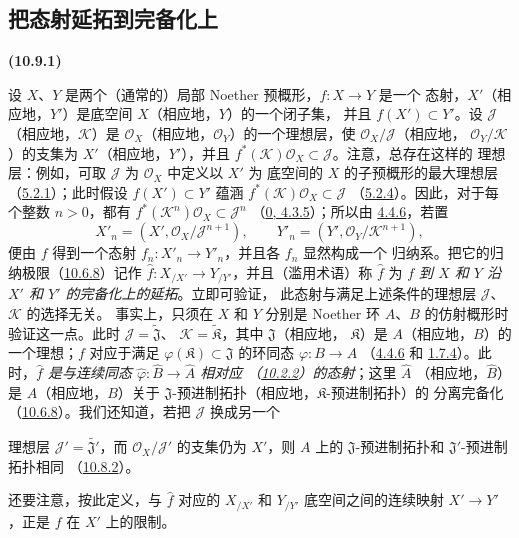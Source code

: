 \documentclass[UTF8,fontset=none,11pt,oneside,openany]{ctexbook}
\newenvironment{env}[1][]{%
  \par\medskip\noindent\textbf{(#1)}\ %
}{\par}
\newcommand{\oldpage}[2][]{%
  \hypertarget{ega-source-page-#1-#2}{}%
  \marginnote{\scriptsize\textbf{#1}~|~#2}\ignorespaces}
\let\EGAOriginalLabel\label
\renewcommand{\label}[1]{\phantomsection\EGAOriginalLabel{#1}}
\begin{document}
\subsection{把态射延拓到完备化上}
\label{subsection:I.10.9-fr}

\begin{env}[10.9.1]
\label{I.10.9.1-fr}
设 $X$、$Y$ 是两个（通常的）局部 Noether 预概形，$f:X\to Y$ 是一个
态射，$X'$（相应地，$Y'$）是底空间 $X$（相应地，$Y$）的一个闭子集，
并且 $f(X')\subset Y'$。设 $\mathscr{J}$（相应地，$\mathscr{K}$）是
$\mathscr{O}_X$（相应地，$\mathscr{O}_Y$）的一个理想层，使
$\mathscr{O}_X/\mathscr{J}$（相应地，
$\mathscr{O}_Y/\mathscr{K}$）的支集为 $X'$（相应地，$Y'$），并且
$f^*(\mathscr{K})\mathscr{O}_X\subset\mathscr{J}$。注意，总存在这样的
理想层：例如，可取 $\mathscr{J}$ 为 $\mathscr{O}_X$ 中定义以 $X'$ 为
底空间的 $X$ 的子预概形的最大理想层
（\hyperref[I.5.2.1-fr]{5.2.1}）；此时假设 $f(X')\subset Y'$ 蕴涵
$f^*(\mathscr{K})\mathscr{O}_X\subset\mathscr{J}$
（\hyperref[I.5.2.4-fr]{5.2.4}）。因此，对于每个整数 $n>0$，都有
$f^*(\mathscr{K}^n)\mathscr{O}_X\subset\mathscr{J}^n$
（\hyperref[0.4.3.5-fr]{0, 4.3.5}）；所以由
\hyperref[I.4.4.6-fr]{4.4.6}，若置
\[
  X'_n=(X',\mathscr{O}_X/\mathscr{J}^{n+1}),\qquad
  Y'_n=(Y',\mathscr{O}_Y/\mathscr{K}^{n+1}),
\]
便由 $f$ 得到一个态射 $f_n:X'_n\to Y'_n$，并且各 $f_n$ 显然构成一个
归纳系。把它的归纳极限（\hyperref[I.10.6.8-fr]{10.6.8}）记作
$\widehat f:X_{/X'}\to Y_{/Y'}$，并且（滥用术语）称 $\widehat f$ 为
\emph{$f$ 到 $X$ 和 $Y$ 沿 $X'$ 和 $Y'$ 的完备化上的延拓}。立即可验证，
此态射与满足上述条件的理想层 $\mathscr{J}$、$\mathscr{K}$ 的选择无关。
事实上，只须在 $X$ 和 $Y$ 分别是 Noether 环 $A$、$B$ 的仿射概形时
验证这一点。此时
$\mathscr{J}=\widetilde{\mathfrak{J}}$、
$\mathscr{K}=\widetilde{\mathfrak{K}}$，其中 $\mathfrak{J}$（相应地，
$\mathfrak{K}$）是 $A$（相应地，$B$）的一个理想；$f$ 对应于满足
$\varphi(\mathfrak{K})\subset\mathfrak{J}$ 的环同态
$\varphi:B\to A$
（\hyperref[I.4.4.6-fr]{4.4.6} 和
\hyperref[I.1.7.4-fr]{1.7.4}）。此时，\emph{$\widehat f$ 是与连续同态
$\widehat\varphi:\widehat B\to\widehat A$ 相对应
（\hyperref[I.10.2.2-fr]{10.2.2}）的态射}；这里 $\widehat A$
（相应地，$\widehat B$）是 $A$（相应地，$B$）关于
$\mathfrak{J}$-预进制拓扑（相应地，$\mathfrak{K}$-预进制拓扑）的
分离完备化（\hyperref[I.10.6.8-fr]{10.6.8}）。我们还知道，若把
$\mathscr{J}$ 换成另一个

\oldpage[I]{199}

理想层 $\mathscr{J}'=\widetilde{\mathfrak{J}'}$，而
$\mathscr{O}_X/\mathscr{J}'$ 的支集仍为 $X'$，则 $A$ 上的
$\mathfrak{J}$-预进制拓扑和 $\mathfrak{J}'$-预进制拓扑相同
（\hyperref[I.10.8.2-fr]{10.8.2}）。

还要注意，按此定义，与 $\widehat f$ 对应的 $X_{/X'}$ 和 $Y_{/Y'}$
底空间之间的连续映射 $X'\to Y'$，正是 $f$ 在 $X'$ 上的限制。
\end{env}
\end{document}
